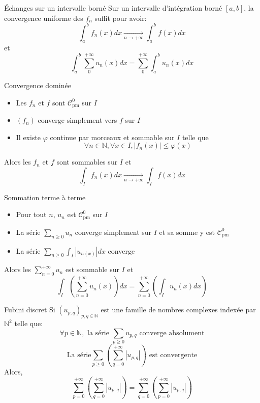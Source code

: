 \documentclass[french, a4paper, 10pt, twocolumn]{article}
\newcommand{\N}{\mathbb{N}}   %
\newcommand{\czero}{\mathcal{C}^{0}}
\newcommand{\po}{\left(}         %
\newcommand{\pf}{\right)}        %
\newcommand{\pof}[1]{\po #1 \pf} %
\renewcommand{\phi}{\varphi}
\begin{document}
\begin{theoreme}{Échanges sur un intervalle borné}
  Sur un intervalle d'intégration borné \([a,b]\), la convergence uniforme des \(f_n\) suffit pour avoir:
    \[\int_a^b f_n(x)dx \xrightarrow[n\rightarrow +\infty]{} \int_a^b f(x)dx\]
    et
    \[\int_a^b \sum_0^{+\infty} u_n(x)dx = \sum_0^{+\infty} \int_a^b u_n(x)dx\]
\end{theoreme}

\begin{theoreme}{Convergence dominée}
  \begin{itemize}[label=$\bullet$]
    \item Les \(f_n\) et \(f\) sont \(\czero_{\text{pm}}\) sur \(I\)
    \item $(f_{n})$ converge simplement vers $f$ sur \(I\)
    \item Il existe $\phi$ continue par morceaux et sommable sur \(I\) telle que
      \[\forall n \in \N, \forall x \in I, \left\lvert f_{n}(x)\right\rvert\leqslant \phi(x)\]
  \end{itemize}
  \tcblower
  Alors les $f_{n}$ et $f$ sont sommables sur $I$ et
  \[\int_{I}f_{n}(x)dx\xrightarrow[n\rightarrow +\infty]{}\int_{I}f(x)dx\]
\end{theoreme}

\begin{theoreme}{Sommation terme à terme}
  \begin{itemize}[label=$\bullet$]
    \item Pour tout $n$, $u_{n}$ est $\czero_{\text{pm}}$ sur \(I\)
    \item La série $\sum_{n \geq 0} u_{n}$ converge simplement sur \(I\) et sa somme y est \(\czero_{\text{pm}}\)
    \item La série \(\sum_{n\geqslant 0}\int_I |u_{n(x)}|dx\) converge

  \end{itemize}
  \tcblower
  Alors les $\sum\limits_{n=0}^{+\infty}u_{n}$ est sommable sur $I$ et
  \[\int_{I}\pof{\sum_{n=0}^{+\infty}u_{n}(x)}dx = \sum_{n=0}^{+\infty} \pof{\int_{I}u_{n}(x)dx}\]
\end{theoreme}

\begin{theoreme}{Fubini discret}
  Si \((u_{p,q})_{p,q \in \N}\) est une famille de nombres complexes indexée par \(\N^2\) telle que:
    \[\forall p \in \N, \text{ la série } \sum_{p\geq 0} u_{p,q} \text{ converge absolument} \]
    \[\text{La série} \sum_{p\geq 0} \left( \sum_{q=0}^{+\infty} |u_{p,q}| \right) \text{ est convergente}\]
  Alors,
    \[\sum_{p=0}^{+\infty} \left( \sum_{q=0}^{+\infty} |u_{p,q}| \right) = \sum_{q=0}^{+\infty} \left( \sum_{p=0}^{+\infty} |u_{p,q}| \right)\]
\end{theoreme}
\end{document}
